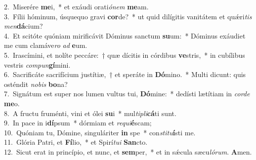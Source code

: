 {2.~}Miserére \textbf{me}i,~* et exáudi orati\textit{ó}\textit{nem} \textbf{me}am.\\
{3.~}Fílii hóminum, úsquequo gravi \textbf{cor}de?~* ut quid dilígitis vanitátem et quǽri\textit{tis} \textit{men}\textbf{dá}cium?\\
{4.~}Et scitóte quóniam mirificávit Dóminus sanctum \textbf{su}um:~* Dóminus exáudiet me cum clamáve\textit{ro} \textit{ad} \textbf{e}um.\\
{5.~}Irascímini, et nolíte peccáre:~† quæ dícitis in córdibus \textbf{ve}stris,~* in cubílibus vestris \textit{com}\textit{pun}\textbf{gí}mini.\\
{6.~}Sacrificáte sacrifícium justítiæ,~† et speráte in \textbf{Dó}mino.~* Multi dicunt: quis osténdit \textit{no}\textit{bis} \textbf{bo}na?\\
{7.~}Signátum est super nos lumen vultus tui, \textbf{Dó}mine:~* dedísti lætítiam in \textit{cor}\textit{de} \textbf{me}o.\\
{8.~}A fructu fruménti, vini et ólei \textbf{su}i~* mul\textit{ti}\textit{pli}\textbf{cá}ti sunt.\\
{9.~}In pace in i\textbf{dí}psum~* dórmiam et \textit{re}\textit{qui}\textbf{é}scam;\\
{10.~}Quóniam tu, Dómine, singuláriter \textbf{in} spe~* con\textit{sti}\textit{tu}\textbf{í}sti me.\\
{11.~}Glória Patri, et \textbf{Fí}lio,~* et Spirí\textit{tu}\textit{i} \textbf{San}cto.\\
{12.~}Sicut erat in princípio, et nunc, et \textbf{sem}per,~* et in sǽcula sæcu\textit{ló}\textit{rum}. \textbf{A}men.\\
